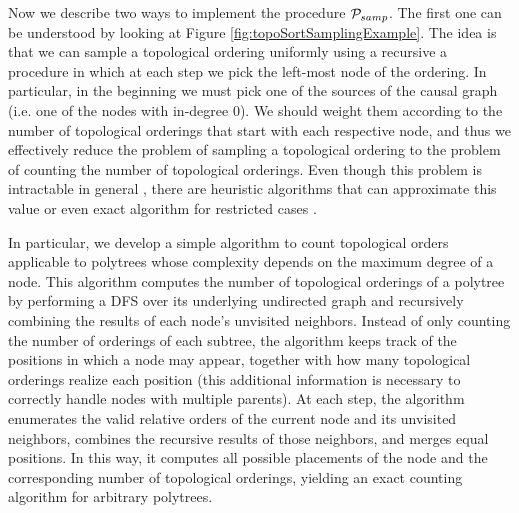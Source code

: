 Now we describe two ways to implement the procedure $\mathcal{P}_{samp}$. The first one can be understood by looking at Figure \ref{fig:topoSortSamplingExample}. The idea is that we can sample a topological ordering uniformly using a recursive a procedure in which at each step we pick the left-most node of the ordering. In particular, in the beginning we must pick one of the sources of the causal graph (i.e. one of the nodes with in-degree 0). We should weight them according to the number of topological orderings that start with each respective node, and thus we effectively reduce the problem of sampling a topological ordering to the problem of counting the number of topological orderings. Even though this problem is intractable in general \parencite{countingLinearExtensions}, there are heuristic algorithms that can approximate this value or even exact algorithm for restricted cases \parencite{efficientCountingOfToposorts}. 

In particular, we develop a simple algorithm to count topological orders applicable to polytrees whose complexity depends on the maximum degree of a node. 
This algorithm computes the number of topological orderings of a polytree by performing a DFS over its underlying undirected graph and recursively combining the results of each node’s unvisited neighbors. Instead of only counting the number of orderings of each subtree, the algorithm keeps track of the positions in which a node may appear, together with how many topological orderings realize each position (this additional information is necessary to correctly handle nodes with multiple parents). At each step, the algorithm enumerates the valid relative orders of the current node and its unvisited neighbors, combines the recursive results of those neighbors, and merges equal positions. In this way, it computes all possible placements of the node and the corresponding number of topological orderings, yielding an exact counting algorithm for arbitrary polytrees.

